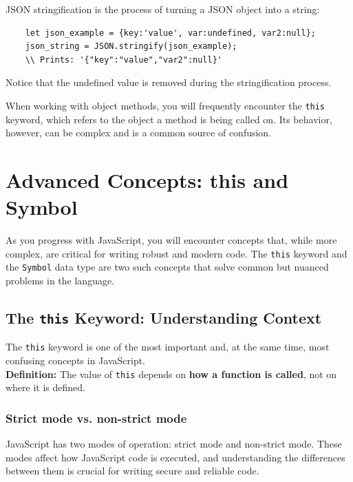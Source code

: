 \documentclass{scrbook}
\begin{document}
JSON stringification is the process of turning a JSON object into a string:
\begin{lstlisting}
    let json_example = {key:'value', var:undefined, var2:null};
    json_string = JSON.stringify(json_example);
    \\ Prints: '{"key":"value","var2":null}'
\end{lstlisting}

Notice that the undefined value is removed during the stringification process.

When working with object methods, you will frequently encounter the \texttt{this} keyword, which refers to the object a method is being called on. Its behavior, however, can be complex and is a common source of confusion.

\chapter{Advanced Concepts: this and Symbol}

As you progress with JavaScript, you will encounter concepts that, while more complex, are critical for writing robust and modern code. The \texttt{this} keyword and the \texttt{Symbol} data type are two such concepts that solve common but nuanced problems in the language.

\section{The \texttt{this} Keyword: Understanding Context}

The \texttt{this} keyword is one of the most important and, at the same time, most confusing concepts in JavaScript.\\

\textbf{Definition:} The value of \texttt{this} depends on \textbf{how a function is called}, not on where it is defined.

\subsection{Strict mode vs. non-strict mode}

JavaScript has two modes of operation: strict mode and non-strict mode. These modes affect how JavaScript code is executed, and understanding the differences between them is crucial for writing secure and reliable code.
\end{document}
